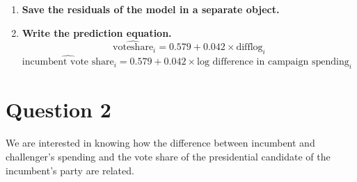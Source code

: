 \documentclass[12pt,letterpaper]{article}
\begin{document}
\begin{enumerate}
		\item \textbf{Save the residuals of the model in a separate object.}
			
		
		\item \textbf{Write the prediction equation.} 
		{\LARGE $$ \widehat{\text{voteshare}}_i = 0.579 + 0.042 \times \text{difflog}_i $$}
		\noindent $ \widehat{\text{incumbent vote share}}_i = 0.579 + 0.042 \times \text{log difference in campaign spending}_i $
		
	\end{enumerate}
	
\newpage

\section*{Question 2}
\noindent We are interested in knowing how the difference between incumbent and challenger's spending and the vote share of the presidential candidate of the incumbent's party are related.	\vspace{.25cm}
	
\end{document}
